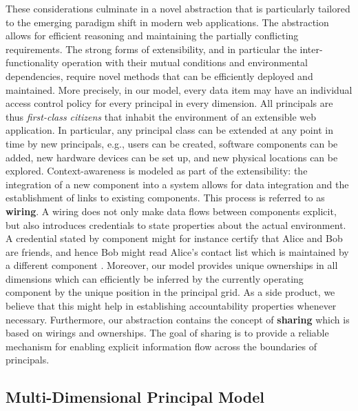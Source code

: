 \documentclass{src/acm_proc_article-sp} \else
\begin{document}
These considerations culminate in a novel abstraction that
is particularly tailored to the emerging paradigm shift in
modern web applications.
The abstraction allows for efficient reasoning and
maintaining the partially conflicting requirements. The
strong forms of extensibility, and in particular the
inter-functionality operation with their mutual conditions
and environmental dependencies, require novel methods that
can be efficiently deployed and maintained.
More precisely, in our model, every data item may have an
individual access control policy for every principal in
every dimension.
All principals are thus \emph{first-class citizens} that
inhabit the environment of an extensible web application.
In particular, any principal class can be extended at any
point in time by new principals, e.g., users can be created,
software components can be added, new hardware devices can
be set up, and new physical locations can be explored.
Context-awareness is modeled as part of the extensibility:
the integration of a new component into a system allows for
data integration and the establishment of links to existing
components. This process is referred to as \textbf{wiring}.
A wiring does not only make data flows between components
explicit, but also introduces credentials to state
properties about the actual environment. A credential stated
by component  might for instance certify that Alice and
Bob are friends, and hence Bob might read Alice's contact list
which is maintained by a different component .
Moreover, our model provides unique ownerships in all
dimensions which can efficiently be inferred by the
currently operating component by the unique position in the
principal grid. As a side product, we believe that this
might help in establishing accountability properties
whenever necessary.
Furthermore, our abstraction contains the concept of
\textbf{sharing} which is based on wirings and ownerships.
The goal of sharing is to provide a reliable mechanism for
enabling explicit information flow across the boundaries of
principals.















\subsection{Multi-Dimensional Principal Model}
\end{document}
